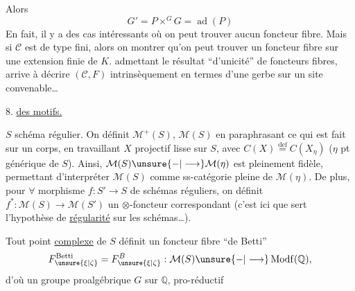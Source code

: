 Alors
\[
G'=P\times^G G=\operatorname{ad}(P)
\]
En fait, il y a des cas intéressants où  on peut trouver aucun foncteur fibre. Mais si $\mathcal C$ est de type fini, alors on  montrer qu'on peut trouver un foncteur fibre sur une extension finie de $K$.
admettant le résultat ``d'unicité'' de foncteurs fibres,  arrive à décrire $(\mathcal C,F)$ intrinsèquement en termes d'une gerbe sur un site convenable\dots

8. \uline{ des motifs.}

$S$ schéma régulier. 
On définit $\mathcal{M}^+(S)$, $\mathcal{M}(S)$ en paraphrasant ce qui est fait sur un corps, en travaillant  $X$ projectif lisse sur $S$, avec $C(X)\overset{\mathrm{def}}=C(X_\eta)$ ($\eta$ pt générique de $S$).
Ainsi, $\mathcal{M}(S)\unsure{-|\longrightarrow}\mathcal{M}(\eta)$ est pleinement fidèle, permettant d'interpréter $\mathcal{M}(S)$ comme ss-catégorie pleine de $\mathcal{M}(\eta)$.
De plus, pour $\forall$ morphisme $f:S'\longrightarrow S$ de schémas réguliers, on définit $f^*:\mathcal{M}(S)\longrightarrow \mathcal{M}(S')$ un $\otimes$-foncteur correspondant (c'est ici que sert l'hypothèse de \uline{régularité} sur les schémas\dots).

Tout point  \uline{complexe} de $S$ définit un foncteur fibre ``de Betti'' 
\[
F_{\unsure{\xi|\zeta}}^{\mathrm{Betti}}=F_{\unsure{\xi|\zeta}}^B:
\mathcal{M}(S)\unsure{-|\longrightarrow}\operatorname{Modf}(\mathbb{Q}),
\]
d'où un groupe proalgébrique $G$ sur $\mathbb{Q}$, pro-réductif
